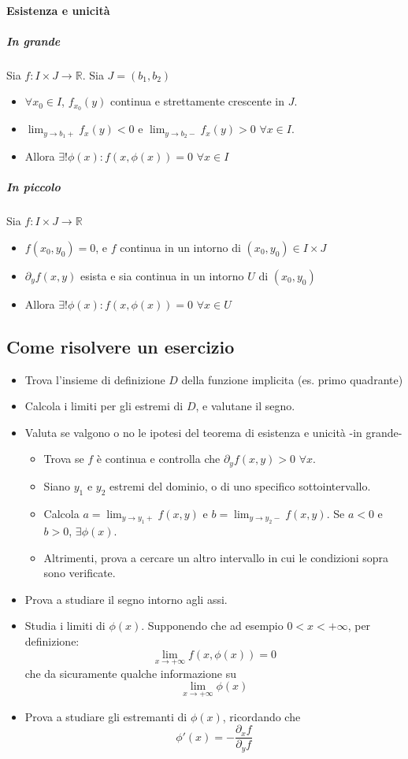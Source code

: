 \documentclass[a4paper,12pt]{book}
\begin{document}
\paragraph{Esistenza e unicità}
\subparagraph{In grande}
Sia $f: I \times J \rightarrow \mathbb{R}$. Sia $J = (b_1, b_2)$
\begin{itemize}
 \item $\forall x_0 \in I$, $f_{x_0}(y) $ continua e strettamente crescente in $J$.
 \item $\displaystyle\lim_{y \to b_1+}f_x(y) < 0$ e $\displaystyle\lim_{y \to b_2-} f_x(y) > 0$ $\forall x \in I$.
 \item Allora $\exists ! \phi(x): f(x, \phi(x)) = 0$ $\forall x \in I$ 
\end{itemize}
\subparagraph{In piccolo}
Sia $f: I \times J \rightarrow \mathbb{R}$
\begin{itemize}
 \item $f(x_0, y_0) = 0$, e $f$ continua in un intorno di $(x_0, y_0) \in I\times J$
 \item $\partial_y f(x, y)$ esista e sia continua in un intorno $U$ di $(x_0, y_0)$
 \item Allora $\exists ! \phi(x): f(x, \phi(x)) = 0$ $	\forall x \in U$
\end{itemize}
\subsection{Come risolvere un esercizio}
\begin{itemize}
 \item Trova l'insieme di definizione $D$ della funzione implicita (es. primo quadrante)
 \item Calcola i limiti per gli estremi di $D$, e valutane il segno.
 \item Valuta se valgono o no le ipotesi del teorema di esistenza e unicità -in grande-
 \begin{itemize}
  \item Trova se $f$ è continua e controlla che $\partial_y f(x, y) > 0$ $\forall x$.
  \item Siano $y_1$ e $y_2$ estremi del dominio, o di uno specifico sottointervallo.
  \item Calcola $a = \displaystyle\lim_{y \to y_1+}{f(x, y)}$ e $b = \displaystyle\lim_{y \to y_2-}{f(x, y)}$. Se $a < 0$ e $b > 0$, $\exists \phi(x)$.
  \item Altrimenti, prova a cercare un altro intervallo in cui le condizioni sopra sono verificate.
 \end{itemize}
 \item Prova a studiare il segno intorno agli assi.
 \item Studia i limiti di $\phi(x)$. Supponendo che ad esempio $0 < x < +\infty$, per definizione:
	 $$ \lim_{x \to +\infty} f(x, \phi(x)) = 0$$
	 che da sicuramente qualche informazione su
	 $$ \lim_{x \to +\infty} \phi(x) $$
 \item Prova a studiare gli estremanti di $\phi(x)$, ricordando che
 	 $$\phi'(x) = -\displaystyle\frac{\partial_x f}{\partial_y f}$$
\end{itemize}
\end{document}
